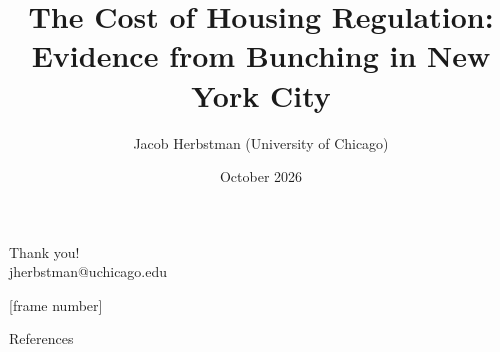 \documentclass[11pt,notes=hide,aspectratio=169,mathserif]{beamer}
\title[Housing Regulation]{The Cost of Housing Regulation: Evidence from Bunching in New York City}
\author[Jacob Herbstman]{Jacob Herbstman (University of Chicago)}
\date{October 2026}
\begin{document}
\begin{frame}[plain]
\titlepage
\end{frame}













\begin{frame}[plain]
    \begin{center}
      {\LARGE Thank you!}\\[0.4em]
      {\large {jherbstman@uchicago.edu}}
    \end{center}
\end{frame}

\appendix
{}[frame number]
\begin{frame}[allowframebreaks]{References}
    \tiny
    \renewcommand{\bibsection}{}
    
    
\end{frame}






\end{document}
